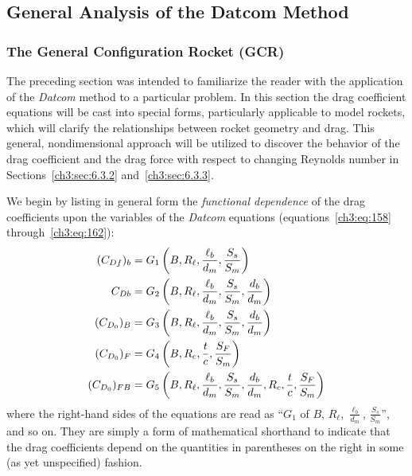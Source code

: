 \subsection{General Analysis of the Datcom Method}\label{ch3:sec:6.3}

\subsubsection{The General Configuration Rocket (GCR)}\label{ch3:sec:6.3.1}

The preceding section was intended to familiarize the reader with the application of the
\emph{Datcom} method to a particular problem. In this section the drag coefficient equations will
be cast into special forms, particularly applicable to model rockets, which will clarify the
relationships between rocket geometry and drag. This general, nondimensional approach will be
utilized to discover the behavior of the drag coefficient and the drag force with respect to
changing Reynolds number in Sections~\ref{ch3:sec:6.3.2} and~\ref{ch3:sec:6.3.3}.

We begin by listing in general form the \emph{functional dependence} of the drag coefficients upon
the variables of the \emph{Datcom} equations (equations~\eqref{ch3:eq:158}
through~\eqref{ch3:eq:162}):
\begin{align}
(C_{Df})_b &= G_1\left(B, R_\ell, \frac{\ell_b}{d_m}, \frac{S_s}{S_m}\right) \label{ch3:eq:175}\\
C_{Db} &= G_2\left(B, R_\ell, \frac{\ell_b}{d_m}, \frac{S_s}{S_m}, \frac{d_b}{d_m}\right)
  \label{ch3:eq:176}\\
(C_{D_0})_B &= G_3\left(B, R_\ell, \frac{\ell_b}{d_m}, \frac{S_s}{S_m}, \frac{d_b}{d_m}\right)
  \label{ch3:eq:177}\\
(C_{D_0})_F &= G_4\left(B, R_c, \frac{t}{c}, \frac{S_F}{S_m}\right) \label{ch3:eq:178}\\
(C_{D_0})_{FB} &= G_5\left(B, R_\ell, \frac{\ell_b}{d_m}, \frac{S_s}{S_m}, \frac{d_b}{d_m}, R_c,
  \frac{t}{c}, \frac{S_F}{S_m}\right) \label{ch3:eq:179}
\end{align}
where the right-hand sides of the equations are read as ``$G_1$ of $B$, $R_\ell$,
$\frac{\ell_b}{d_m}$, $\frac{S_s}{S_m}$'', and so on. They are simply a form of mathematical
shorthand to indicate that the drag coefficients depend on the quantities in parentheses on the
right in some (as yet unspecified) fashion.


